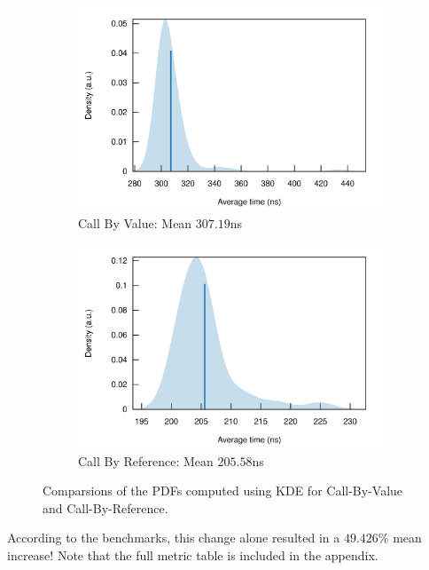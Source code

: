 \begin{figure}[H]
\centering
\begin{subfigure}{.5\textwidth}
  \centering
  \includegraphics[width=\linewidth]{./assets/callbyvaluepdf}
  \caption{Call By Value: Mean $307.19$ns}
\end{subfigure}%
\begin{subfigure}{.5\textwidth}
  \centering
  \includegraphics[width=\linewidth]{./assets/callbyrefpdf}
  \caption{Call By Reference: Mean $205.58$ns}
\end{subfigure}
  \caption{Comparsions of the \acp{PDF} computed using \ac{KDE} for Call-By-Value and Call-By-Reference.}
\end{figure}

According to the benchmarks, this change alone resulted in a $49.426\%$ mean increase! Note that the full metric table is included in the appendix.\\

